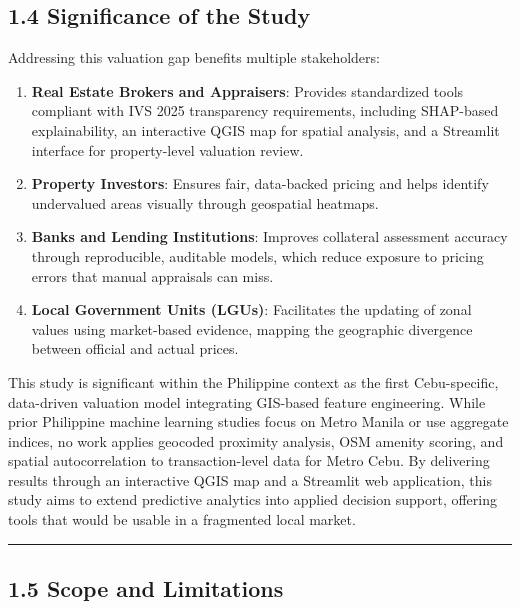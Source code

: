 \subsection{\texorpdfstring{\textbf{1.4 Significance of the Study}}{1.4 Significance of the Study}}\label{significance-of-the-study}

Addressing this valuation gap benefits multiple stakeholders:

\begin{enumerate}
\item \textbf{Real Estate Brokers and Appraisers}: Provides standardized tools compliant with IVS 2025 transparency requirements, including SHAP-based explainability, an interactive QGIS map for spatial analysis, and a Streamlit interface for property-level valuation review.
\item \textbf{Property Investors}: Ensures fair, data-backed pricing and helps identify undervalued areas visually through geospatial heatmaps.
\item \textbf{Banks and Lending Institutions}: Improves collateral assessment accuracy through reproducible, auditable models, which reduce exposure to pricing errors that manual appraisals can miss.
\item \textbf{Local Government Units (LGUs)}: Facilitates the updating of zonal values using market-based evidence, mapping the geographic divergence between official and actual prices.
\end{enumerate}

This study is significant within the Philippine context as the first Cebu-specific, data-driven valuation model integrating GIS-based feature engineering. While prior Philippine machine learning studies focus on Metro Manila or use aggregate indices, no work applies geocoded proximity analysis, OSM amenity scoring, and spatial autocorrelation to transaction-level data for Metro Cebu. By delivering results through an interactive QGIS map and a Streamlit web application, this study aims to extend predictive analytics into applied decision support, offering tools that would be usable in a fragmented local market.

\begin{center}\rule{0.5\linewidth}{0.5pt}\end{center}

\subsection{\texorpdfstring{\textbf{1.5 Scope and Limitations}}{1.5 Scope and Limitations}}\label{scope-and-limitations}

